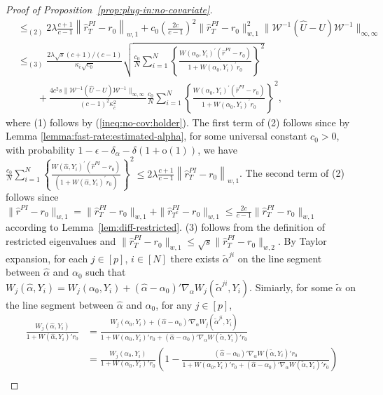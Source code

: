 \documentclass[11pt]{article}
\newcommand{\norm}[1]{\left\lVert #1 \right\rVert}
\begin{document}
\begin{proof}[Proof of Proposition~\ref{prop:plug-in:no-covariate}]
$$\begin{array}{rl}
&\displaystyle \leq_{(2)}2\lambda\frac{c+1}{c-1}\norm{\hat{r}_T^{PI}-r_0}_{w,1} + c_0\left(\frac{2c}{c-1}\right)^2\|\hat r_T^{PI} - r_0\|_{w,1}^2 \|\mathcal{W}^{-1}(\hat U - U)\mathcal{W}^{-1} \|_{\infty,\infty}\\
&\displaystyle \leq_{(3)} \frac{2\lambda\sqrt{s}(c+1)/(c-1)}{\kappa_{\bar c}\sqrt{c_0}}\sqrt{\frac{c_0}{N} \sum_{i=1}^N\left\{\frac{W(\alpha_0,Y_i)^\prime(\hat{r}^{PI}-r_0)}{1+W(\alpha_0,Y_i)^\prime r_0}\right\}^2}  \\
&\displaystyle\quad\quad + \frac{4c^2s\|\mathcal{W}^{-1}(\hat U - U)\mathcal{W}^{-1} \|_{\infty,\infty}}{(c-1)^2\kappa_{\bar c}^2}\frac{c_0}{N} \sum_{i=1}^N\left\{\frac{W(\alpha_0,Y_i)^\prime(\hat{r}^{PI}-r_0)}{1+W(\alpha_0,Y_i)^\prime r_0}\right\}^2,
\end{array}$$
where (1) follows by (\ref{ineq:no-cov:holder}). The first term of (2) follows since by Lemma \ref{lemma:fast-rate:estimated-alpha}, for some universal constant $c_0>0$, with probability $1-\epsilon-\delta_{\alpha}-\delta(1+\mathrm{o}(1))$, we have $\frac{c_0}{N}\sum_{i=1}^N\!\left\{\frac{W(\hat\alpha,Y_i)^\prime(\hat{r}^{PI}-r_0)}{(1+W(\hat\alpha,Y_i)^\prime r_0)}\right\}^2\!\!\leq2\lambda\frac{c+1}{c-1}\norm{\hat{r}_T^{PI}-r_0}_{w,1}$. The second term of (2) follows since $\|\hat{r}^{PI}-r_0\|_{w,1}=\|\hat{r}_T^{PI}-r_0\|_{w,1}+\|\hat{r}_{T^c}^{PI}-r_0\|_{w,1}\leq\frac{2c}{c-1}\|\hat{r}_T^{PI}-r_0\|_{w,1}$ according to Lemma~\ref{lem:diff-restricted}. (3) follows from the definition of restricted eigenvalues and $\|\hat{r}_T^{PI}-r_0\|_{w,1}\leq\sqrt{s}\|\hat{r}_T^{PI}-r_0\|_{w,2}$. By Taylor expansion, for each $j\in[p]$, $i\in[N]$ there exists $\tilde \alpha^{ji}$ on the line segment between $\hat \alpha$ and $\alpha_0$ such that
$W_j(\hat\alpha,Y_i) = W_j(\alpha_0,Y_i) + (\hat\alpha-\alpha_0)'\nabla_\alpha W_j(\tilde \alpha^{ji},Y_i)$. Simiarly, for some $\tilde\alpha$ on the line segment between $\hat{\alpha}$ and $\alpha_0$, for any $j\in[p]$, 
$$\begin{array}{rl}
\displaystyle\frac{W_j(\hat\alpha,Y_i)}{1+W(\hat\alpha,Y_i)'r_0}&\displaystyle= \frac{W_j(\alpha_0,Y_i) +   (\hat\alpha-\alpha_0)'\nabla_\alpha W_j(\tilde \alpha^{ji},Y_i)}{1+W(\alpha_0,Y_i)'r_0 + (\hat\alpha-\alpha_0)'\nabla_\alpha W(\tilde \alpha,Y_i)'r_0} \\
&\displaystyle = \frac{W_j(\alpha_0,Y_i) }{1+W(\alpha_0,Y_i)'r_0} \left( 1 -  \frac{(\hat\alpha-\alpha_0)'\nabla_\alpha W(\tilde \alpha,Y_i)'r_0}{1+W(\alpha_0,Y_i)'r_0 + (\hat\alpha-\alpha_0)'\nabla_\alpha W(\tilde \alpha,Y_i)'r_0}\right)\\

\end{array}$$
\end{proof}
\end{document}
